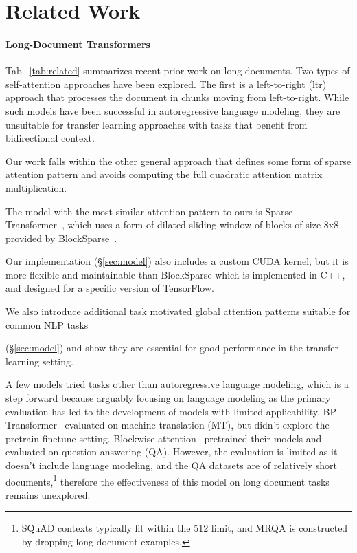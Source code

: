\section{Related Work}
\label{sec:related}

\paragraph{Long-Document Transformers}
Tab.~\ref{tab:related} summarizes recent prior work on long documents. Two types of self-attention approaches have been explored. The first is a left-to-right (ltr) approach that processes the document in chunks moving from left-to-right. While such models have been successful in autoregressive language modeling, they are unsuitable for transfer learning approaches with tasks that benefit from bidirectional context.

Our work falls within the other general approach that defines some form of sparse attention pattern and avoids computing the full quadratic attention matrix multiplication.

The model with the most similar attention pattern to ours is Sparse Transformer~\cite{sparseOpenai}, which uses a form of dilated sliding window of blocks of size 8x8 provided by BlockSparse~\cite{blocksparse}. 

Our implementation (\S\ref{sec:model}) also includes a custom CUDA kernel, but it is more flexible and maintainable than BlockSparse which is implemented in C++, and designed for a specific version of TensorFlow.

We also introduce additional task motivated global attention patterns suitable for common NLP tasks

(\S\ref{sec:model}) and show they are essential for good performance in the transfer learning setting.

A few models tried tasks other than autoregressive language modeling, which is a step forward because arguably focusing on language modeling as the primary evaluation has led to the development of models with limited applicability.  BP-Transformer~\cite{BPTransformer} evaluated on machine translation (MT), but didn't explore the pretrain-finetune setting. Blockwise attention~\cite{blockbert} pretrained their models and evaluated on question answering (QA). However, the evaluation is limited as it doesn't include language modeling, and the QA datasets are of relatively short documents,\footnote{
SQuAD contexts typically fit within the 512 limit, and MRQA is constructed by dropping long-document examples. 

} therefore the effectiveness of this model on long document tasks remains unexplored.

